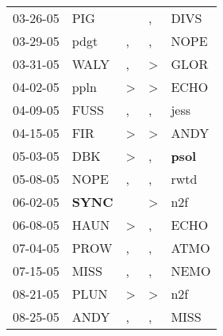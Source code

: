 \begin{supertabular}{p{0.07\textwidth}p{0.06\textwidth}p{0.02\textwidth}p{0.02\textwidth}p{0.06\textwidth}}
          03-26-05\textsuperscript{} &            PIG\textsuperscript{} &                  &             , &           DIVS\textsuperscript{} \\
          03-29-05\textsuperscript{} &           pdgt\textsuperscript{} &                , &             , &           NOPE\textsuperscript{} \\
          03-31-05\textsuperscript{} &           WALY\textsuperscript{} &                , &  \textgreater &           GLOR\textsuperscript{} \\
          04-02-05\textsuperscript{} &           ppln\textsuperscript{} &     \textgreater &  \textgreater &           ECHO\textsuperscript{} \\
          04-09-05\textsuperscript{} &           FUSS\textsuperscript{} &                , &             , &           jess\textsuperscript{} \\
          04-15-05\textsuperscript{} &            FIR\textsuperscript{} &     \textgreater &  \textgreater &           ANDY\textsuperscript{} \\
          05-03-05\textsuperscript{} &            DBK\textsuperscript{} &     \textgreater &             , &  \textbf{psol\textsuperscript{}} \\
          05-08-05\textsuperscript{} &           NOPE\textsuperscript{} &                , &             , &           rwtd\textsuperscript{} \\
          06-02-05\textsuperscript{} &  \textbf{SYNC\textsuperscript{}} &                  &  \textgreater &            n2f\textsuperscript{} \\
          06-08-05\textsuperscript{} &           HAUN\textsuperscript{} &     \textgreater &             , &           ECHO\textsuperscript{} \\
          07-04-05\textsuperscript{} &           PROW\textsuperscript{} &                , &             , &           ATMO\textsuperscript{} \\
          07-15-05\textsuperscript{} &           MISS\textsuperscript{} &                , &             , &           NEMO\textsuperscript{} \\
          08-21-05\textsuperscript{} &           PLUN\textsuperscript{} &     \textgreater &  \textgreater &            n2f\textsuperscript{} \\
          08-25-05\textsuperscript{} &           ANDY\textsuperscript{} &                , &             , &           MISS\textsuperscript{} \\

\end{supertabular}

